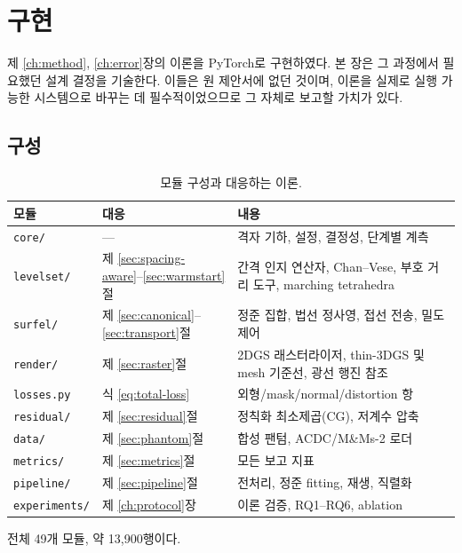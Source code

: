 \chapter{구현}
\label{ch:impl}

제 \ref{ch:method}, \ref{ch:error}장의 이론을 PyTorch로 구현하였다. 본 장은 그 과정에서
필요했던 설계 결정을 기술한다. 이들은 원 제안서에 없던 것이며, 이론을 실제로 실행
가능한 시스템으로 바꾸는 데 필수적이었으므로 그 자체로 보고할 가치가 있다.

\section{구성}

\begin{table}[htbp]
\centering
\small
\caption{모듈 구성과 대응하는 이론.}
\label{tab:modules}
\begin{tabular}{@{}llp{6.6cm}@{}}
\toprule
모듈 & 대응 & 내용 \\
\midrule
\texttt{core/}        & --- & 격자 기하, 설정, 결정성, 단계별 계측 \\
\texttt{levelset/}    & 제 \ref{sec:spacing-aware}--\ref{sec:warmstart}절
                      & 간격 인지 연산자, Chan--Vese, 부호 거리 도구, marching tetrahedra \\
\texttt{surfel/}      & 제 \ref{sec:canonical}--\ref{sec:transport}절
                      & 정준 집합, 법선 정사영, 접선 전송, 밀도 제어 \\
\texttt{render/}      & 제 \ref{sec:raster}절
                      & 2DGS 래스터라이저, thin-3DGS 및 mesh 기준선, 광선 행진 참조 \\
\texttt{losses.py}    & 식 \eqref{eq:total-loss} & 외형/mask/normal/distortion 항 \\
\texttt{residual/}    & 제 \ref{sec:residual}절 & 정칙화 최소제곱(CG), 저계수 압축 \\
\texttt{data/}        & 제 \ref{sec:phantom}절 & 합성 팬텀, ACDC/M\&Ms-2 로더 \\
\texttt{metrics/}     & 제 \ref{sec:metrics}절 & 모든 보고 지표 \\
\texttt{pipeline/}    & 제 \ref{sec:pipeline}절 & 전처리, 정준 fitting, 재생, 직렬화 \\
\texttt{experiments/} & 제 \ref{ch:protocol}장 & 이론 검증, RQ1--RQ6, ablation \\
\bottomrule
\end{tabular}
\end{table}

전체 49개 모듈, 약 13{,}900행이다.

